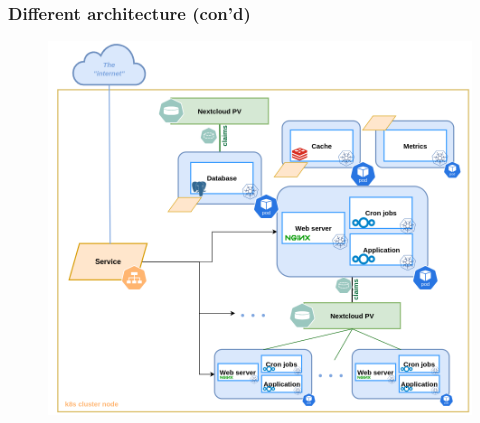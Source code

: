 \documentclass{beamer}
\begin{document}
\begin{frame}
    \frametitle{Different architecture (con'd)}
    \begin{figure}
        \includegraphics[height=0.85\textheight]{images/other/exadvanceddiagram}
    \end{figure}
\end{frame}
\end{document}
